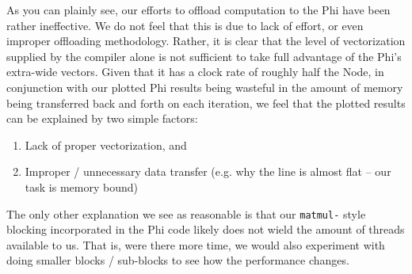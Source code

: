 \documentclass[11pt]{article}
\begin{document}
\noindent As you can plainly see, our efforts to offload computation to the Phi have been rather ineffective.  We do not feel that this is due to lack of effort, or even improper offloading methodology.  Rather, it is clear that the level of vectorization supplied by the compiler alone is not sufficient to take full advantage of the Phi's extra-wide vectors.  Given that it has a clock rate of roughly half the Node, in conjunction with our plotted Phi results being wasteful in the amount of memory being transferred back and forth on each iteration, we feel that the plotted results can be explained by two simple factors:

\begin{enumerate}[1.]
	\item Lack of proper vectorization, and
	\item Improper / unnecessary data transfer (e.g. why the line is almost flat -- our task is memory bound)
\end{enumerate}

\noindent The only other explanation we see as reasonable is that our \texttt{matmul-} style blocking incorporated in the Phi code likely does not wield the amount of threads available to us.  That is, were there more time, we would also experiment with doing smaller blocks / sub-blocks to see how the performance changes.
\end{document}
